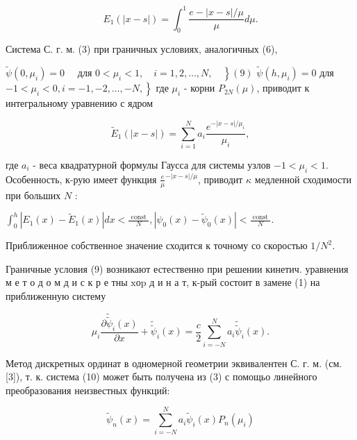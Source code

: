 \documentclass[10pt]{article}
\begin{document}
\[

E_{1}(|x-s|)=\int_{0}^{1} \frac{e-|x-s| / \mu}{\mu} d \mu .

\]



Система С. г. м. (3) при граничных условиях, аналогичных (6),



$\tilde{\psi}\left(0, \mu_{i}\right)=0 \quad$ для $\left.0<\mu_{i}<1, \quad i=1,2, \ldots, N, \quad\right\}(9)$ $\tilde{\psi}\left(h, \mu_{i}\right)=0$ для $\left.-1<\mu_{i}<0, i=-1,-2, \ldots,-N,\right\}$ где $\mu_{i}$ - корни $P_{2 N}(\mu)$, приводит к интегральному уравнению с ядром



\[

\tilde{E}_{1}(|x-s|)=\sum_{i=1}^{N} a_{i} \frac{e^{-|x-s| / \mu_{i}}}{\mu_{i}},

\]



где $a_{i}$ - веса квадратурной формулы Гаусса для системы узлов $-1<\mu_{i}<1$. Особенность, к-рую имеет функция $\frac{e}{\mu}^{-|x-s| / \mu}$, приводит $\kappa$ медленной сходимости при больших $N$ :



$\int_{0}^{h}\left|E_{1}(x)-\tilde{E}_{1}(x)\right| d x<\frac{\text { const }}{N},\left|\psi_{0}(x)-\tilde{\psi}_{0}(x)\right|<\frac{\text { const }}{N}$.



Приближенное собственное значение сходится к точному со скоростью $1 / N^{2}$.



Граничные условия (9) возникают естественно при решении кинетич. уравнения м е т о д о м д и с к р е тны $\mathrm{x} о \mathrm{p}$ д и н а т, к-рый состоит в замене (1) на приближенную систему



\[

\mu_{i} \frac{\partial \tilde{\tilde{\psi}}_{i}(x)}{\partial x}+\tilde{\tilde{\psi}}_{i}(x)=\frac{c}{2} \sum_{i=-N}^{N} a_{i} \tilde{\tilde{\psi}}_{i}(x) .

\]



Метод дискретных ординат в одномерной геометрии эквивалентен С. г. м. (см. [3]), т. к. система (10) может быть получена из (3) с помощьо линейного преобразования неизвестных функций:



\[

\tilde{\psi}_{n}(x)=\sum_{i=-N}^{N} a_{i} \tilde{\psi}_{i}(x) P_{n}\left(\mu_{i}\right)

\]
\end{document}
